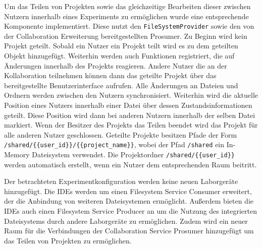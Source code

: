 Um das Teilen von Projekten sowie das gleichzeitige Bearbeiten dieser zwischen Nutzern innerhalb eines Experiments zu ermöglichen wurde eine entsprechende Komponente implementiert. Diese nutzt den \texttt{FileSystemProvider} sowie den von der Collaboration Erweiterung bereitgestellten Prosumer. Zu Beginn wird kein Projekt geteilt. Sobald ein Nutzer ein Projekt teilt wird es zu dem geteilten Objekt hinzugefügt. Weiterhin werden auch Funktionen registriert, die auf Änderungen innerhalb des Projekts reagieren. Andere Nutzer die an der Kollaboration teilnehmen können dann das geteilte Projekt über das bereitgestellte Benutzerinterface aufrufen. Alle Änderungen an Dateien und Ordnern werden zwischen den Nutzern synchronisiert. Weiterhin wird die aktuelle Position eines Nutzers innerhalb einer Datei über dessen Zustandsinformationen geteilt. Diese Position wird dann bei anderen Nutzern innerhalb der selben Datei markiert. Wenn der Besitzer des Projekts das Teilen beendet wird das Projekt für alle anderen Nutzer geschlossen. Geteilte Projekte besitzen Pfade der Form \texttt{/shared/\{\{user\_id\}\}/\{\{project\_name\}\}}, wobei der Pfad \texttt{/shared} ein In-Memory Dateisystem verwendet. Die Projektordner \texttt{/shared/\{\{user\_id\}\}} werden automatisch erstellt, wenn ein Nutzer dem entsprechenden Raum beitritt.

Der betrachteten Experimentkonfiguration werden keine neuen Laborgeräte hinzugefügt. Die IDEs werden um einen Filesystem Service Consumer erweitert, der die Anbindung von weiteren Dateisystemen ermöglicht. Außerdem bieten die IDEs auch einen Filesystem Service Producer an um die Nutzung des integrierten Dateisystems durch andere Laborgeräte zu ermöglichen. Zudem wird ein neuer Raum für die Verbindungen der Collaboration Service Prosumer hinzugefügt um das Teilen von Projekten zu ermöglichen.